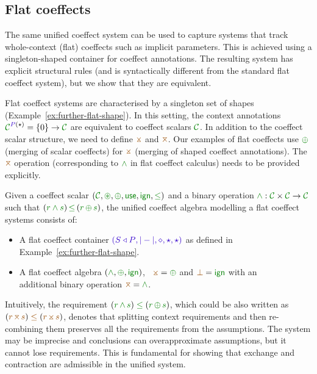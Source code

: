
\subsection{Flat coeffects}
\label{sec:further-flat}

The same unified coeffect system can be used to capture systems that track whole-context (flat)
coeffects such as implicit parameters. This is achieved using a singleton-shaped container for
coeffect annotations. The resulting system has explicit structural rules (and is syntactically
different from the standard flat coeffect system), but we show that they are equivalent.

Flat coeffect systems are characterised by a singleton set of shapes (Example~\ref{ex:further-flat-shape}).
In this setting, the context annotations $\C^{ \SP(\sflat) } = \{0\} \rightarrow \C$ are equivalent
to coeffect scalars $\C$. In addition to the coeffect scalar structure, we need to define $\apar$
and $\azip$. Our examples of flat coeffects use $\cpar$ (merging of scalar coeffects) for $\apar$
(merging of shaped coeffect annotations). The $\azip$ operation (corresponding to $\czip$
in flat coeffect calculus) needs to be provided explicitly.

\begin{definition}
\label{def:further-flat}
Given a coeffect scalar $(\C, \cseq, \cpar, \cunit, \czero, \cleq)$ and a binary operation
$\cclrd{\wedge} : \C \times \C \rightarrow \C$ such that $(\cclrd{r \wedge s}) \,\cleq\, (\cclrd{r}\,\cpar\,\cclrd{s})$,
the unified coeffect algebra modelling a flat coeffect systems consists of:
%
\begin{itemize}{}
\item A flat coeffect container $\sclrd{(\SHP, {|}-{|}, \diamond, \sflat, \sflat)}$ as defined in
  Example~\ref{ex:further-flat-shape}.

\item A flat coeffect algebra $(\czip, \cpar, \czero)$, \ie~$\apar = \cpar$
  and $\azero = \czero$ with an\\ additional binary operation $\azip = \czip$.
\end{itemize}
\end{definition}

\noindent
Intuitively, the requirement $(\cclrd{r}\,\czip\,\cclrd{s}) \;\cleq\; (\cclrd{r}\,\cpar\,\cclrd{s})$,
which could be also written as $(\aclrd{r}\,\azip\,\aclrd{s}) \;\aclrd{\leq}\; (\aclrd{r}\,\apar\,\aclrd{s})$,
denotes that splitting context requirements and then re-combining them preserves all the requirements
from the assumptions. The system may be imprecise and conclusions can overapproximate assumptions, but
it cannot lose requirements. This is fundamental for showing that exchange and contraction are admissible
in the unified system.

